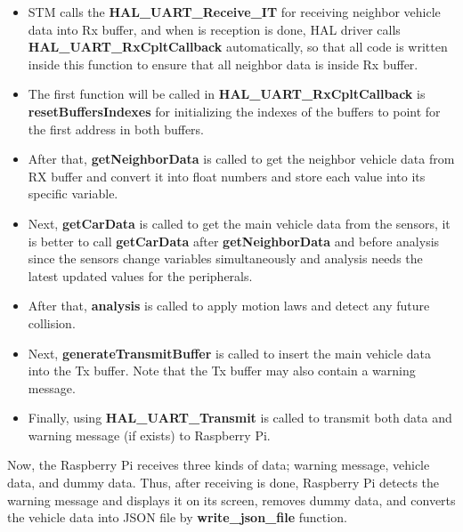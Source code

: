 \begin{itemize}
    \item STM calls the \textbf{HAL\_UART\_Receive\_IT} for receiving neighbor vehicle data into Rx buffer, and when is reception is done, HAL driver calls \textbf{HAL\_UART\_RxCpltCallback} automatically, so that all code is written inside this function to ensure that all neighbor data is inside Rx buffer.
    \item The first function will be called in \textbf{HAL\_UART\_RxCpltCallback} is                  \textbf{resetBuffersIndexes} for initializing the indexes of the buffers to point for the first address in both buffers.
    \item After that, \textbf{getNeighborData} is called to get the neighbor vehicle data from RX buffer and convert it into float numbers and store each value into its specific variable.
    \item Next, \textbf{getCarData} is called to get the main vehicle data from the sensors, it is better to call \textbf{getCarData} after \textbf{getNeighborData} and before analysis since the sensors change variables simultaneously and analysis needs the latest updated values for the peripherals.
    \item After that, \textbf{analysis} is called to apply motion laws and detect any future collision.
    \item Next, \textbf{generateTransmitBuffer} is called to insert the main vehicle data into the Tx buffer. Note that the Tx buffer may also contain a warning message.
    \item Finally, using \textbf{HAL\_UART\_Transmit} is called to transmit both data and warning message (if exists) to Raspberry Pi.
\end{itemize}
Now, the Raspberry Pi receives three kinds of data; warning message, vehicle data, and dummy data. Thus, after receiving is done, Raspberry Pi detects the warning message and displays it on its screen, removes dummy data, and converts the vehicle data into JSON file by \textbf{write\_json\_file} function.



